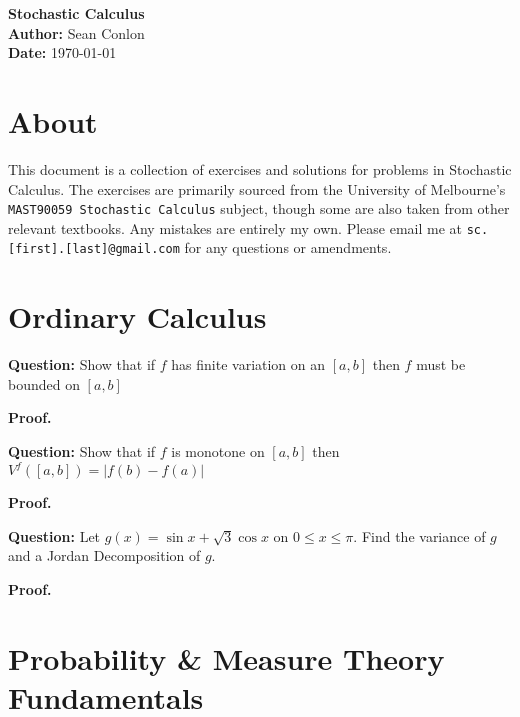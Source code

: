 \documentclass{article}
\begin{document}
\begin{titlepage}
    \centering
    {\Huge \textbf{Stochastic Calculus}}\\[1.5cm] %
    \textbf{Author:} Sean Conlon\\[1cm] %
    \textbf{Date:} \today\\[3cm] %
    
    \section*{About}
    This document is a collection of exercises and solutions for problems in Stochastic Calculus. The exercises are primarily sourced from the University of Melbourne's \texttt{MAST90059 Stochastic Calculus} subject, though some are also taken from other relevant textbooks. Any mistakes are entirely my own. Please email me at \texttt{sc.[first].[last]@gmail.com} for any questions or amendments.\\[2cm]

    \tableofcontents
    
\end{titlepage}

\newpage
\section{Ordinary Calculus}

\begin{tcolorbox}[colframe=black,colback=gray!5,boxrule=0.5pt]
\textbf{Question:} Show that if $f$ has finite variation on an $[a,b]$ then $f$ must be bounded on $[a,b]$
\end{tcolorbox}
\textbf{Proof.}

\begin{tcolorbox}[colframe=black,colback=gray!5,boxrule=0.5pt]
\textbf{Question:} Show that if $f$ is monotone on $[a,b]$ then $V^f([a,b]) = |f(b)-f(a)|$
\end{tcolorbox}
\textbf{Proof.}


\begin{tcolorbox}[colframe=black,colback=gray!5,boxrule=0.5pt]
\textbf{Question:} Let $g(x) = \sin x + \sqrt{3}\cos x$ on $0\leq x \leq \pi$. Find the variance of $g$ and a Jordan Decomposition of $g$.
\end{tcolorbox}
\textbf{Proof.}


\newpage
\section{Probability \& Measure Theory Fundamentals}
\end{document}
